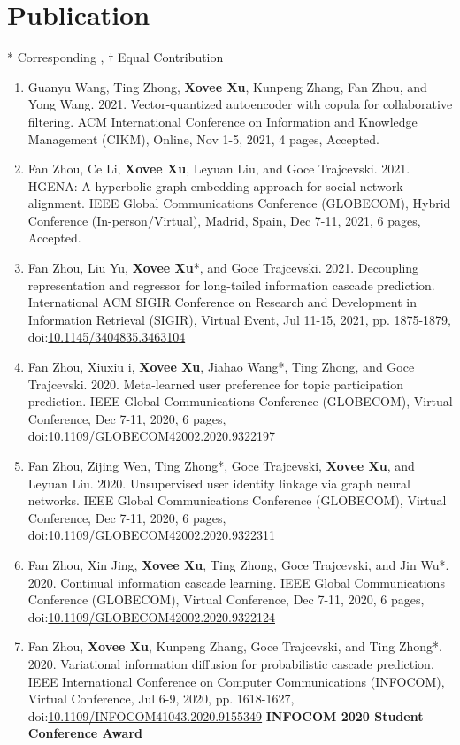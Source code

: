 \section*{Publication}
\indent

* Corresponding
, $\dagger$ Equal Contribution


\begin{enumerate}[resume]
    \item Guanyu Wang, Ting Zhong, \textbf{Xovee Xu}, Kunpeng Zhang, Fan Zhou, and Yong Wang. 2021. Vector-quantized autoencoder with copula for collaborative filtering. ACM International Conference on Information and Knowledge Management (CIKM), Online, Nov 1-5, 2021, 4 pages, Accepted. 
    \item Fan Zhou, Ce Li, \textbf{Xovee Xu}, Leyuan Liu, and Goce Trajcevski. 2021. HGENA: A hyperbolic graph embedding approach for social network alignment. IEEE Global Communications Conference (GLOBECOM), Hybrid Conference (In-person/Virtual), Madrid, Spain, Dec 7-11, 2021, 6 pages, Accepted. 
    \item Fan Zhou, Liu Yu, \textbf{Xovee Xu}*, and Goce Trajcevski. 2021. Decoupling representation and regressor for long-tailed information cascade prediction. International ACM SIGIR Conference on Research and Development in Information Retrieval (SIGIR), Virtual Event, Jul 11-15, 2021, pp. 1875-1879, doi:\href{https://doi.org/10.1145/3404835.3463104}{10.1145/3404835.3463104}
    \item Fan Zhou, Xiuxiu \swashQ i, \textbf{Xovee Xu}, Jiahao Wang*, Ting Zhong, and Goce Trajcevski. 2020. Meta-learned user preference for topic participation prediction. IEEE Global Communications Conference (GLOBECOM), Virtual Conference, Dec 7-11, 2020, 6 pages, doi:\href{https://doi.org/10.1109/GLOBECOM42002.2020.9322197}{10.1109/GLOBECOM42002.2020.9322197}
    \item Fan Zhou, Zijing Wen, Ting Zhong*, Goce Trajcevski, \textbf{Xovee Xu}, and Leyuan Liu. 2020. Unsupervised user identity linkage via graph neural networks. IEEE Global Communications Conference (GLOBECOM), Virtual Conference, Dec 7-11, 2020, 6 pages, doi:\href{https://doi.org/10.1109/GLOBECOM42002.2020.9322311}{10.1109/GLOBECOM42002.2020.9322311}
    \item Fan Zhou, Xin Jing, \textbf{Xovee Xu}, Ting Zhong, Goce Trajcevski, and Jin Wu*. 2020. Continual information cascade learning. IEEE Global Communications Conference (GLOBECOM), Virtual Conference, Dec 7-11, 2020, 6 pages, doi:\href{https://doi.org/10.1109/GLOBECOM42002.2020.9322124}{10.1109/GLOBECOM42002.2020.9322124}
    \item Fan Zhou, \textbf{Xovee Xu}, Kunpeng Zhang, Goce Trajcevski, and Ting Zhong*. 2020. Variational information diffusion for probabilistic cascade prediction. IEEE International Conference on Computer Communications (INFOCOM), Virtual Conference, Jul 6-9, 2020, pp. 1618-1627, doi:\href{https://doi.org/10.1109/INFOCOM41043.2020.9155349}{10.1109/INFOCOM41043.2020.9155349}
    \newline \textbf{\color{red}INFOCOM 2020 Student Conference Award}
\end{enumerate}

